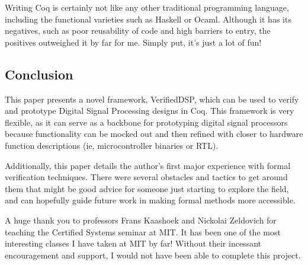 \documentclass[preprint,12pt]{sigplanconf}
\begin{document}
Writing Coq is certainly not like any other traditional programming
language, including the functional varieties such as Haskell or
Ocaml. Although it has its negatives, such as poor reusability of code
and high barriers to entry, the positives outweighed it by far for
me. Simply put, it's just a lot of fun!


\subsection{Conclusion}
This paper presents a novel framework, VerifiedDSP, which can be used
to verify and prototype Digital Signal Processing designs in Coq. This
framework is very flexible, as it can serve as a backbone for
prototyping digital signal processors because functionality can be
mocked out and then refined with closer to hardware function
descriptions (ie, microcontroller binaries or RTL). 

Additionally, this paper details the author's first major experience
with formal verification techniques. There were several obstacles and
tactics to get around them that might be good advice for someone just
starting to explore the field, and can hopefully guide future work in
making formal methods more accessible.








\acks
A huge thank you to professors Frans Kaashoek and Nickolai Zeldovich
for teaching the Certified Systems seminar at MIT. It has been one of
the most interesting classes I have taken at MIT by far! Without their
incessant encouragement and support, I would not have been able to complete
this project.


\begingroup
\raggedright

\endgroup
\end{document}
